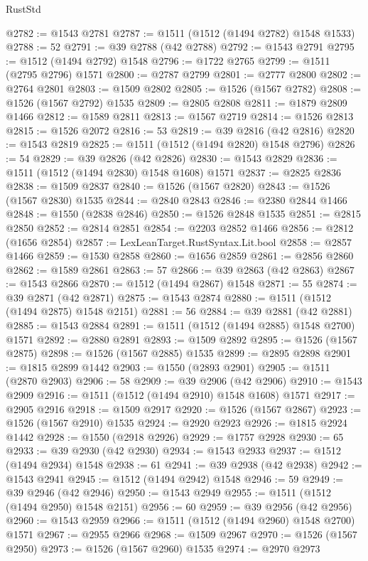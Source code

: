 \begin{lexlean}{RustStd}
\begin{coremodule}
{{@2782 := @1543 @2781
@2787 := @1511 (@1512 (@1494 @2782) @1548 @1533)
@2788 := 52
@2791 := @39 @2788 (@42 @2788)
@2792 := @1543 @2791
@2795 := @1512 (@1494 @2792) @1548
@2796 := @1722 @2765
@2799 := @1511 (@2795 @2796) @1571
@2800 := @2787 @2799
@2801 := @2777 @2800
@2802 := @2764 @2801
@2803 := @1509 @2802
@2805 := @1526 (@1567 @2782)
@2808 := @1526 (@1567 @2792) @1535
@2809 := @2805 @2808
@2811 := @1879 @2809 @1466
@2812 := @1589 @2811
@2813 := @1567 @2719
@2814 := @1526 @2813
@2815 := @1526 @2072
@2816 := 53
@2819 := @39 @2816 (@42 @2816)
@2820 := @1543 @2819
@2825 := @1511 (@1512 (@1494 @2820) @1548 @2796)
@2826 := 54
@2829 := @39 @2826 (@42 @2826)
@2830 := @1543 @2829
@2836 := @1511 (@1512 (@1494 @2830) @1548 @1608) @1571
@2837 := @2825 @2836
@2838 := @1509 @2837
@2840 := @1526 (@1567 @2820)
@2843 := @1526 (@1567 @2830) @1535
@2844 := @2840 @2843
@2846 := @2380 @2844 @1466
@2848 := @1550 (@2838 @2846)
@2850 := @1526 @2848 @1535
@2851 := @2815 @2850
@2852 := @2814 @2851
@2854 := @2203 @2852 @1466
@2856 := @2812 (@1656 @2854)
@2857 := LexLeanTarget.RustSyntax.Lit.bool
@2858 := @2857 @1466
@2859 := @1530 @2858
@2860 := @1656 @2859
@2861 := @2856 @2860
@2862 := @1589 @2861
@2863 := 57
@2866 := @39 @2863 (@42 @2863)
@2867 := @1543 @2866
@2870 := @1512 (@1494 @2867) @1548
@2871 := 55
@2874 := @39 @2871 (@42 @2871)
@2875 := @1543 @2874
@2880 := @1511 (@1512 (@1494 @2875) @1548 @2151)
@2881 := 56
@2884 := @39 @2881 (@42 @2881)
@2885 := @1543 @2884
@2891 := @1511 (@1512 (@1494 @2885) @1548 @2700) @1571
@2892 := @2880 @2891
@2893 := @1509 @2892
@2895 := @1526 (@1567 @2875)
@2898 := @1526 (@1567 @2885) @1535
@2899 := @2895 @2898
@2901 := @1815 @2899 @1442
@2903 := @1550 (@2893 @2901)
@2905 := @1511 (@2870 @2903)
@2906 := 58
@2909 := @39 @2906 (@42 @2906)
@2910 := @1543 @2909
@2916 := @1511 (@1512 (@1494 @2910) @1548 @1608) @1571
@2917 := @2905 @2916
@2918 := @1509 @2917
@2920 := @1526 (@1567 @2867)
@2923 := @1526 (@1567 @2910) @1535
@2924 := @2920 @2923
@2926 := @1815 @2924 @1442
@2928 := @1550 (@2918 @2926)
@2929 := @1757 @2928
@2930 := 65
@2933 := @39 @2930 (@42 @2930)
@2934 := @1543 @2933
@2937 := @1512 (@1494 @2934) @1548
@2938 := 61
@2941 := @39 @2938 (@42 @2938)
@2942 := @1543 @2941
@2945 := @1512 (@1494 @2942) @1548
@2946 := 59
@2949 := @39 @2946 (@42 @2946)
@2950 := @1543 @2949
@2955 := @1511 (@1512 (@1494 @2950) @1548 @2151)
@2956 := 60
@2959 := @39 @2956 (@42 @2956)
@2960 := @1543 @2959
@2966 := @1511 (@1512 (@1494 @2960) @1548 @2700) @1571
@2967 := @2955 @2966
@2968 := @1509 @2967
@2970 := @1526 (@1567 @2950)
@2973 := @1526 (@1567 @2960) @1535
@2974 := @2970 @2973
}}
\end{coremodule}
\end{lexlean}
